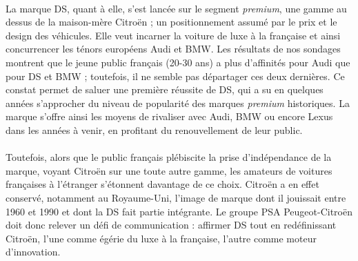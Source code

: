 \documentclass[12pt]{article}\usepackage[]{graphicx}\usepackage[]{color}
\begin{document}
\paragraph{} La marque DS, quant à elle, s’est lancée sur le segment \textit{premium}, une gamme au dessus de la maison-mère Citroën ; un positionnement assumé par le prix et le design des véhicules. Elle veut incarner la voiture de luxe à la française et ainsi concurrencer les ténors européens Audi et BMW. Les résultats de nos sondages montrent que le jeune public français (20-30 ans) a plus d'affinités pour Audi que pour DS et BMW ; toutefois, il ne semble pas départager ces deux dernières. Ce constat permet de saluer une première réussite de DS, qui a su en quelques années s'approcher du niveau de popularité des marques \textit{premium} historiques. La marque s'offre ainsi les moyens de rivaliser avec Audi, BMW ou encore Lexus dans les années à venir, en profitant du renouvellement de leur public.


\paragraph{} Toutefois, alors que le public français plébiscite la prise d'indépendance de la marque, voyant Citroën sur une toute autre gamme, les amateurs de voitures françaises à l'étranger s'étonnent davantage de ce choix. Citroën a en effet conservé, notamment au Royaume-Uni, l'image de marque dont il jouissait entre 1960 et 1990 et dont la DS fait partie intégrante. Le groupe PSA Peugeot-Citroën doit donc relever un défi de communication : affirmer DS tout en redéfinissant Citroën, l'une comme égérie du luxe à la française, l'autre comme moteur d'innovation.

\printbibliography%
\end{document}
